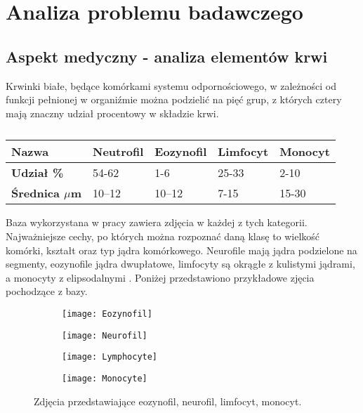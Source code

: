 \chapter{Analiza problemu badawczego}
\label{cha:analiza_problemu_badawczego}

\section{Aspekt medyczny - analiza elementów krwi}
Krwinki białe, będące komórkami systemu odpornościowego, w zależności od funkcji pełnionej w organiźmie można podzielić na pięć grup, z których cztery mają znaczny udział procentowy w składzie krwi.
\begin{table}[h]
\centering
\caption[Short Heading]{}
\begin{tabular}{|l|l|l|l|l|}
\hline
\textbf{Nazwa}                               & Neutrofil & Eozynofil & Limfocyt & Monocyt \\ \hline
\textbf{Udział \%}\cite{Wheater1979FunctionalHA} & 54-62   & 1-6    & 25-33  & 2-10  \\ \hline
\textbf{Średnica  \textbf{$\mu$}m}\cite{Wheater1979FunctionalHA} & 10–12  & 10–12 & 7-15  & 15-30  \\ \hline
\end{tabular}
\end{table}

Baza wykorzystana w pracy zawiera zdjęcia w każdej z tych kategorii. Najważniejsze cechy, po których można rozpoznać daną klasę to wielkość komórki, kształt oraz typ jądra komórkowego. Neurofile mają jądra podzielone na segmenty, eozynofile jądra dwupłatowe, limfocyty są okrągłe z kulistymi jądrami, a monocyty z elipsodalnymi \cite{lymphocytes_nucleus}. Poniżej przedstawiono przykładowe zjęcia pochodzące z bazy.

\begin{figure}[h]
	\centering
	\begin{subfigure}{0.35\textwidth}
		\centering
		\texttt{[image: Eozynofil]}
		\subcaption{\label{subfigure_a}}
	\end{subfigure}
	\begin{subfigure}{0.35\textwidth}
		\centering
		\texttt{[image: Neurofil]}
		\subcaption{\label{subfigure_b}}
	\end{subfigure}
	\begin{subfigure}{0.35\textwidth}
		\centering
		\texttt{[image: Lymphocyte]}
		\subcaption{\label{subfigure_c}}
	\end{subfigure}
	\begin{subfigure}{0.35\textwidth}
		\centering
		\texttt{[image: Monocyte]}
		\subcaption{\label{subfigure_d}}
	\end{subfigure}
	
	\caption{\label{fig:subcaption_example}Zdjęcia przedstawiające \protect{} eozynofil, \protect{} neurofil,  \protect{} limfocyt,  \protect{} monocyt.}
\end{figure}

